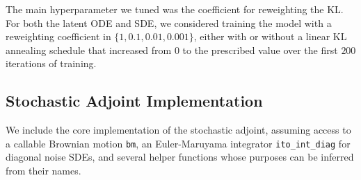 \documentclass[twoside]{article}
\begin{document}
The main hyperparameter we tuned was the coefficient for reweighting the KL. For both the latent ODE and SDE, we considered training the model with a reweighting coefficient in $\{1, 0.1, 0.01, 0.001\}$, either with or without a linear KL annealing schedule that increased from $0$ to the prescribed value over the first $200$ iterations of training. 

 \clearpage
\subsection{Stochastic Adjoint Implementation}\label{app:adjoint_code}
We include the core implementation of the stochastic adjoint, assuming access to a callable Brownian motion \texttt{bm}, an Euler-Maruyama integrator \texttt{ito\_int\_diag} for diagonal noise SDEs, and several helper functions whose purposes can be inferred from their names.
\end{document}
